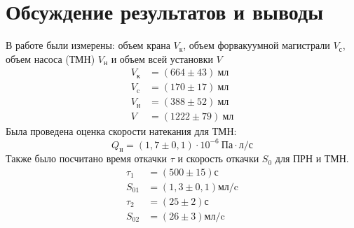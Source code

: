 \documentclass[a4paper,12pt]{article}
\theoremstyle{plain} %
\theoremstyle{definition} %
\theoremstyle{remark} %
\begin{document}
\section{Обсуждение результатов и выводы}
В работе были измерены: объем крана $V_\text{к}$, объем форвакуумной магистрали $V_\text{с}$, объем насоса (ТМН) $V_\text{н}$ и объем всей установки $V$
\begin{align*}
V_\text{к} &= (664 \pm 43)\ \text{мл}\\
V_\text{c} &= (170 \pm 17)\ \text{мл}\\
V_\text{н} &= (388\pm 52)\ \text{мл} \\
V &= (1222 \pm 79)\ \text{мл}
\end{align*}
Была проведена оценка скорости натекания для ТМН:
\[Q_\text{н} = (1,7\pm0,1)\cdot10^{-6}\ \text{Па}\cdot \text{л}/\text{с}\]
Также было посчитано время откачки $\tau$ и скорость откачки $S_0$ для ПРН и ТМН.
\begin{align*}
\tau_1 &= (500 \pm 15) \text{с}\\
S_{01} &= (1,3\pm 0,1) \text{мл}/\text{c}\\
\tau_2 &= (25 \pm 2) \text{с}\\
S_{02} &= (26\pm 3) \text{мл}/\text{c}
\end{align*}
\end{document}
